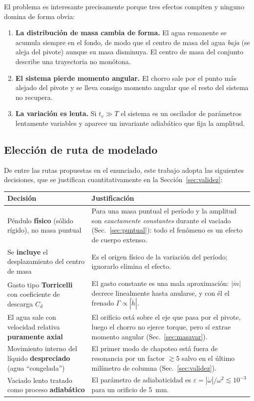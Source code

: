 \documentclass[11pt,a4paper]{article}
\newcommand{\eps}{\varepsilon}
\begin{document}
El problema es interesante precisamente porque tres efectos compiten y ninguno domina de forma obvia:

\begin{enumerate}[label=(\alph*),leftmargin=*]
\item \textbf{La distribución de masa cambia de forma.} El agua remanente se acumula siempre en el
fondo, de modo que el centro de masa del agua \emph{baja} (se aleja del pivote) aunque su masa
disminuya. El centro de masa del conjunto describe una trayectoria no monótona.
\item \textbf{El sistema pierde momento angular.} El chorro sale por el punto más alejado del
pivote y se lleva consigo momento angular que el resto del sistema no recupera.
\item \textbf{La variación es lenta.} Si $t_v \gg T$ el sistema es un oscilador de parámetros
lentamente variables y aparece un invariante adiabático que fija la amplitud.
\end{enumerate}

\subsection{Elección de ruta de modelado}

De entre las rutas propuestas en el enunciado, este trabajo adopta las siguientes decisiones,
que se justifican cuantitativamente en la Sección~\ref{sec:validez}:

\begin{center}
\renewcommand{\arraystretch}{1.25}
\begin{tabular}{@{}p{6.6cm}p{9.2cm}@{}}
\toprule
\textbf{Decisión} & \textbf{Justificación} \\
\midrule
Péndulo \textbf{físico} (sólido rígido), no masa puntual & Para una masa puntual el período y la
amplitud son \emph{exactamente constantes} durante el vaciado (Sec.~\ref{sec:puntual}): todo el
fenómeno es un efecto de cuerpo extenso. \\
Se \textbf{incluye} el desplazamiento del centro de masa & Es el origen físico de la variación del
período; ignorarlo elimina el efecto. \\
Gasto tipo \textbf{Torricelli} con coeficiente de descarga $C_d$ & El gasto constante es una mala
aproximación: $|\dot m|$ decrece linealmente hasta anularse, y con él el frenado
$\Gamma\propto|\dot h|$. \\
El agua sale con velocidad relativa \textbf{puramente axial} & El orificio está sobre el eje que
pasa por el pivote, luego el chorro no ejerce torque, pero sí extrae momento angular
(Sec.~\ref{sec:masavar}). \\
Movimiento interno del líquido \textbf{despreciado} (agua ``congelada'') & El primer modo de
chapoteo está fuera de resonancia por un factor $\gtrsim 5$ salvo en el último milímetro de columna
(Sec.~\ref{sec:validez}). \\
Vaciado lento tratado como proceso \textbf{adiabático} & El parámetro de adiabaticidad es
$\eps=|\dot\omega|/\omega^2\lesssim 10^{-3}$ para un orificio de \SI{5}{\milli\meter}. \\
\bottomrule
\end{tabular}
\end{center}
\end{document}
